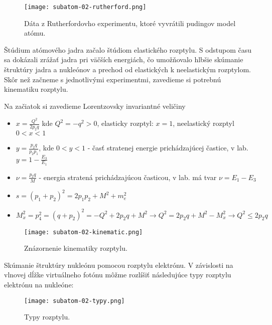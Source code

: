 \documentclass[../../main.tex]{subfiles}
\begin{document}
\begin{figure}[!h]
\texttt{[image: subatom-02-rutherford.png]}
\centering
\caption{Dáta z Rutherfordovho experimentu, ktoré vyvrátili pudingov model atómu.}
\label{sf2:fig:rutherford}
\end{figure}

Štúdium atómového jadra začalo štúdiom elastického rozptylu. S odstupom času sa dokázali zrážať jadra pri väčších energiách, čo umožňovalo hlbšie skúmanie štruktúry jadra a nukleónov a prechod od elastických k neelastickým rozptylom. Skôr než začneme s jednotlivými experimentmi, zavedieme si potrebnú kinematiku rozptylu.

Na začiatok si zavedieme Lorentzovsky invariantné veličiny
\begin{itemize}
\item $x=\frac{Q^2}{2p_2q}$ kde $Q^2=-q^2>0$, elasticky rozptyl: $x=1$, neelastický rozptyl $0<x<1$
\item $y=\frac{p_2q}{p_2p_1}$, kde $0<y<1$ - časť stratenej energie prichádzajúcej častice, v lab. $y=1-\frac{E_3}{E_1}$
\item $\nu = \frac{p_2q}{M}$ - energia stratená prichádzajúcou časticou, v lab. má tvar $\nu = E_1-E_3$
\item $s=(p_1+p_2)^2 = 2p_1p_2+M^2+m_e^2$
\item $M_x^2 = p_4^2 = (q+p_2)^2 = -Q^2+2p_2q+M^2 \rightarrow Q^2 = 2p_2q+M^2-M_x^2 \rightarrow Q^2 \leq 2p_2q$
\end{itemize}

\begin{figure}[!h]
\texttt{[image: subatom-02-kinematic.png]}
\centering
\caption{Znázornenie kinematiky rozptylu.}
\label{sf2:fig:kinematics}
\end{figure}

Skúmanie štruktúry nukleónu pomocou rozptylu elektrónu. V závislosti na vlnovej dĺžke virtuálneho fotónu môžme rozlíšiť následujúce typy rozptylu elektrónu na nukleóne: 

\begin{figure}[!h]
\texttt{[image: subatom-02-typy.png]}
\centering
\caption{Typy rozptylu.}
\label{sf2:fig:typy}
\end{figure}
\end{document}
